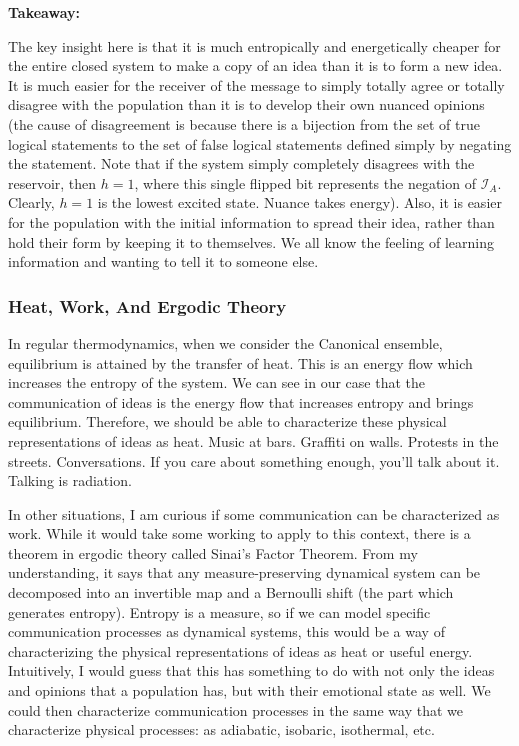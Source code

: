 \documentclass{article}
\begin{document}
\textbf{Takeaway:}

The key insight here is that it is much entropically and energetically cheaper for the entire closed system to make a copy of an idea than it is to form a new idea. It is much easier for the receiver of the message to simply totally agree or totally disagree with the population than it is to develop their own nuanced opinions (the cause of disagreement is because there is a bijection from the set of true logical statements to the set of false logical statements defined simply by negating the statement. Note that if the system simply completely disagrees with the reservoir, then $h=1$, where this single flipped bit represents the negation of $\mathcal{I}_A$. Clearly, $h=1$ is the lowest excited state. Nuance takes energy). Also, it is easier for the population with the initial information to spread their idea, rather than hold their form by keeping it to themselves. We all know the feeling of learning information and wanting to tell it to someone else.\newline

\subsubsection{Heat, Work, And Ergodic Theory}
In regular thermodynamics, when we consider the Canonical ensemble, equilibrium is attained by the transfer of heat. This is an energy flow which increases the entropy of the system. We can see in our case that the communication of ideas is the energy flow that increases entropy and brings equilibrium. Therefore, we should be able to characterize these physical representations of ideas as heat. Music at bars. Graffiti on walls. Protests in the streets. Conversations. If you care about something enough, you'll talk about it. Talking is radiation.

In other situations, I am curious if some communication can be characterized as work. While it would take some working to apply to this context, there is a theorem in ergodic theory called Sinai's Factor Theorem. From my understanding, it says that any measure-preserving dynamical system can be decomposed into an invertible map and a Bernoulli shift (the part which generates entropy). Entropy is a measure, so if we can model specific communication processes as dynamical systems, this would be a way of characterizing the physical representations of ideas as heat or useful energy. Intuitively, I would guess that this has something to do with not only the ideas and opinions that a population has, but with their emotional state as well. We could then characterize communication processes in the same way that we characterize physical processes: as adiabatic, isobaric, isothermal, etc. 
\end{document}
